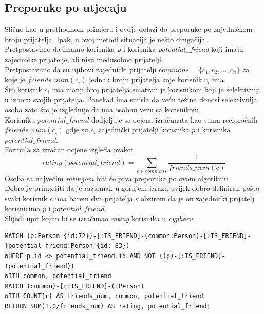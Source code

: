 \documentclass[titlepage, 12pt]{scrartcl}
\begin{document}
\subsection*{Preporuke po utjecaju}
Slično kao u prethodnom primjeru i ovdje dolazi do preporuke po zajedničkom broju prijatelja. Ipak, u ovoj metodi situacija je nešto drugačija. \\
Pretpostavimo da imamo korisnika \emph{p} i korisnika \emph{potential\_friend} koji imaju zajedničke prijatelje, ali nisu međusobno prijatelji. \\
Pretpostavimo da su njihovi zajednički prijatelji $commons = \{c_1, c_2, \dots, c_n\}$ za koje je $friends\_num(c_i)$ jednak broju prijatelja koje korisnik $c_i$ ima. \\
Što korisnik $c_i$ ima manji broj prijatelja smatran je korisnikom koji je selektivniji u izboru svojih prijatelja. Ponekad ima smisla da veću težinu donosi selektivnija osoba zato što je izglednije da ima osobnu vezu sa korisnikom. \\
Korisniku $potential\_friend$ dodjeljuje se ocjena izračunata kao suma recipročnih $friends\_num(c_i)$ gdje su $c_i$ zajednički prijatelji korisnika $p$ i korisnika $potential\_friend$. \\
Formula za izračun ocjene izgleda ovako:
\begin{equation*}
    rating(potential\_friend) = \sum_{c \in commons} \frac{1}{friends\_num(c)}
\end{equation*}
Osoba sa najvećim \emph{ratingom} biti će prva preporuka po ovom algoritmu. \\
Dobro je primjetiti da je razlomak u gornjem izrazu uvijek dobro definiran pošto svaki korisnik $c$ ima barem dva prijatelja s obzirom da je on zajednički prijatelj korisnicima $p$ i $potential\_friend$. \\
Slijedi upit kojim bi se izračunao \emph{rating} korisnika u \emph{cypheru}.

\begin{samepage}
\begin{verbatim}
MATCH (p:Person {id:72})-[:IS_FRIEND]-(common:Person)-[:IS_FRIEND]-
(potential_friend:Person {id: 83}) 
WHERE p.id <> potential_friend.id AND NOT ((p)-[:IS_FRIEND]-(potential_friend)) 
WITH common, potential_friend
MATCH (common)-[r:IS_FRIEND]-(:Person)
WITH COUNT(r) AS friends_num, common, potential_friend
RETURN SUM(1.0/friends_num) AS rating, potential_friend;
\end{verbatim}
\end{samepage}
\end{document}
